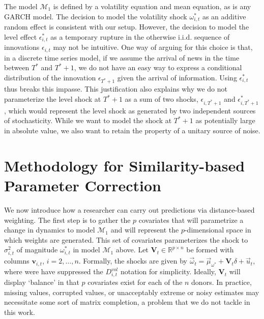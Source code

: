 \documentclass[11pt,3p,review,authoryear]{elsarticle}
\newcommand{\x}{\textbf{v}}
\def\mc#1{\mathcal{#1}} %
\def\mc#1{\mathcal{#1}}
\theoremstyle{definition}
\begin{document}
The model $\mc{M}_1$ is defined by a volatility equation and mean equation, as is any GARCH model.  The decision to model the volatility shock $\omega^{*}_{i,t}$ as an additive random effect is consistent with our setup.  However, the decision to model the level effect $\epsilon^{*}_{i,t}$ as a temporary rupture in the otherwise i.i.d. sequence of innovations $\epsilon_{i,t}$ may not be intuitive.  One way of arguing for this choice is that, in a discrete time series model, if we assume the arrival of news in the time between $T^{*}$ and $T^{*}+1$, we do not have an easy way to express a conditional distribution of the innovation $\epsilon_{T^{*}+1}$ given the arrival of information.  Using $\epsilon^{*}_{i,t}$ thus breaks this impasse.  This justification also explains why we do not parameterize the level shock at $T^{*}+1$ as a sum of two shocks, $\epsilon_{i,T^{*}+1}$ and $\epsilon^{*}_{i,T^{*}+1}$, which would represent the level shock as generated by two independent sources of stochasticity. While we want to model the shock at $T^{*}+1$ as potentially large in absolute value, we also want to retain the property of a unitary source of noise.


\section{Methodology for Similarity-based Parameter Correction}

We now introduce how a researcher can carry out predictions via distance-based weighting.  The first step is to gather the $p$ covariates that will parametrize a change in dynamics to model $\mc{M}_1$ and will represent the $p$-dimensional space in which weights are generated.  This set of covariates parameterizes the shock to $\sigma^2_{i,t}$  of magnitude $\omega^*_{i,t}$ in model $\mc{M}_{1}$ above. Let $\textbf{V}_{t} \in \mathbb{R}^{p \times n}$ be formed with columns $\x_{i,t}$, $i = 2,\ldots,n$. Formally, the shocks are given by $\vec{\omega}_t = \vec{\mu}_{\omega^{*}} + \textbf{V}_{t}\delta + \vec{u}_{t}$, 
    where were have suppressed the $D^{vol}_{i,t}$ notation for simplicity.  %
    Ideally, $\textbf{V}_{t}$ will display `balance' in that $p$ covariates exist for each of the $n$ donors.  In practice, missing values, corrupted values, or unacceptably extreme or noisy estimates may necessitate some sort of matrix completion, a problem that we do not tackle in this work.  
\end{document}
